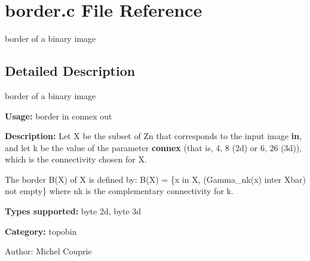\section{border.c File Reference}
\label{border_8c}
border of a binary image  




\label{_details}
\subsection{Detailed Description}
border of a binary image 

{\bf Usage:} border in connex out

{\bf Description:} Let X be the subset of Zn that corresponds to the input image {\bf in}, and let k be the value of the parameter {\bf connex} (that is, 4, 8 (2d) or 6, 26 (3d)), which is the connectivity chosen for X.

The border B(X) of X is defined by: B(X) = \{x in X, (Gamma\_\-nk(x) inter Xbar) not empty\} where nk is the complementary connectivity for k.

{\bf Types supported:} byte 2d, byte 3d

{\bf Category:} topobin

\begin{Desc}
\item[Author:]Michel Couprie \end{Desc}
